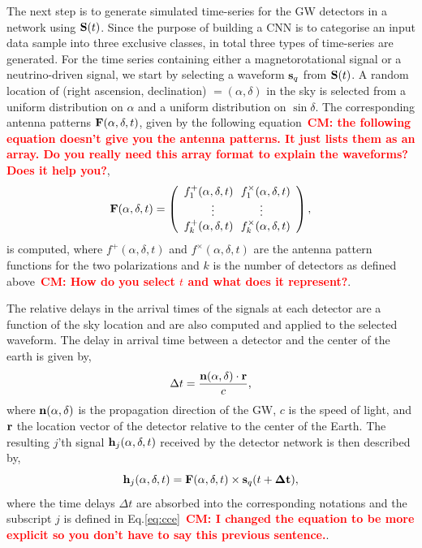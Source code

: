 \documentclass[aps,twocolumn,showpacs,groupedaddress, nofootinbib]{revtex4}  %
\newcommand{\cm}[1]{\textbf{\textcolor{red}{CM: #1}}}
\begin{document}
%
%
The next step is to generate simulated time-series for the \ac{GW} detectors in
a network using $\bold{S}(t)$.
Since the purpose of building a \ac{CNN} is to categorise an input data sample
into three exclusive classes, in total three types of time-series are
generated.  For the time series containing either a magnetorotational signal or
a neutrino-driven signal, we start by selecting a waveform $\bold{s}_q$ from
$\bold{S}(t)$. A random location of (right ascension, declination) $=(\alpha,
\delta)$ in the sky is selected from a uniform distribution on $\alpha$ and a
uniform distribution on $\sin\delta$. The corresponding antenna patterns
$\bold{F}(\alpha, \delta, t)$, given by the following equation~\cm{the
following equation doesn't give you the antenna patterns. It just lists them as
an array. Do you really need this array format to explain the waveforms? Does
it help you?},
%
\begin{equation}\label{eq:ap}
\bold{F}(\alpha, \delta, t)= \left(\begin{array}{cc}
f_1^+(\alpha, \delta, t)~~f_1^\times(\alpha, \delta, t) \\
\vdots~~~~~~~~~~~~\vdots \\
f_k^+(\alpha, \delta, t)~~f_k^\times(\alpha, \delta, t) \\
\end{array}\right),
\end{equation}
%
is computed, where $f^+(\alpha, \delta, t)$ and $f^{\times}(\alpha, \delta, t)$
are the antenna pattern functions for the two polarizations and $k$ is the
number of detectors as defined above~\cm{How do you select $t$ and what does it
represent?}. 

%
%
The relative delays in the arrival times of the signals at each
detector are a function of the sky location and are also computed and applied
to the selected waveform. The delay in arrival time between a detector and the
center of the earth is given by,
%
\begin{equation}\label{eq:tdetector}
\Delta t = \frac{\bold{n}(\alpha,\delta) \cdot \bold{r}}{c},
\end{equation}
%
where $\bold{n}(\alpha,\delta)$ is the propagation direction of the \ac{GW},
$c$ is the speed of light, and $\bold{r}$ the location vector of the detector
relative to the center of the Earth. The resulting $j$'th signal $\bold{h}_j(\alpha,
\delta, t)$ received by the detector network is then described by,
%
\begin{equation}\label{eq:ht2}
 \bold{h}_j(\alpha, \delta, t) = \bold{F}(\alpha, \delta, t) \times
\bold{s}_q(t+\bold{\Delta t}),
\end{equation}
%
where the time delays $\Delta t$ are absorbed into the corresponding notations
and the subscript $j$ is defined in Eq.\ref{eq:cce}~\cm{I changed the equation
to be more explicit so you don't have to say this previous sentence.}. 
\end{document}
